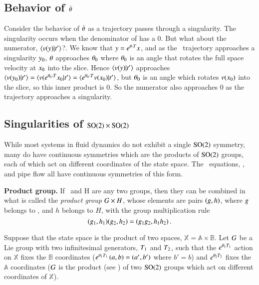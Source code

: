 \subsection{Behavior of $\dot{{\bf \theta}}$}

Consider the behavior of $\dot{{\bf \theta}}$ as a trajectory passes through a singularity. The singularity occurs when the denominator of  has a 0. But what about the numerator, $\braket{\vel(\sspRed)}{\sliceTan{}}$?. We know that $y=e^{{\bf \theta}\cdot T}x$, and as the \reducedsp\ trajectory approaches a singularity $y_0$, ${\bf \theta}$ approaches ${\bf \theta}_0$ where ${\bf \theta}_0$ is an angle that rotates the full space velocity at $x_0$ into the slice. Hence $\braket{\vel(\sspRed)}{\sliceTan{}}$ approaches $\braket{\vel(\sspRed_0)}{\sliceTan{}}
=\braket{\vel(e^{\gSpace_0\cdot\Lg}\ssp_0}{\sliceTan{}}
=\braket{e^{\gSpace_0\cdot\Lg}\vel(\ssp_0)}{\sliceTan{}}$,
but ${\bf \theta}_0$ is an angle which rotates $v(x_0)$ into the slice, so this inner product is 0. So the numerator also approaches 0 as the trajectory approaches a singularity.

\subsection{Singularities of $\textrm{SO}(2) \times \textrm{SO}(2)$}

While most systems in fluid dynamics do not exhibit a single $\textrm{SO}(2)$ symmetry, many do have continuous symmetries which are the products of $\textrm{SO}(2)$ groups, each of which act on different coordinates of the state space. The \KS\ equations, {\pCf}, and pipe flow all have continuous symmetries of this form.

\begin{definition}
\label{def:productGroup}
\textbf{Product group.}
If \Group\ and H are any two groups, then they can be combined in
what is called the {\em product group} $G \times H$, whose
elements are pairs $(g,h)$, where $g$ belongs to \Group, and
$h$ belongs to $H$, with the group multiplication rule
\[
(g_1,h_1)(g_2,h_2)=(g_1 g_2,h_1 h_2)
\,.
\]
\end{definition}

Suppose that the state space is the product of two spaces,
$\mathbb{X}=\mathbb{A} \times \mathbb{B}$. Let $G$ be a Lie group
with two infinitesimal generators, $T_1$ and $T_2$, such that the
$e^{{\bf \theta}_1 T_1}$ action on $\mathbb{X}$ fixes the $\mathbb{B}$
coordinates ($e^{{\bf \theta}_1 T_1} \, (a,b)=(a',b')$ where $b'=b$) and
$e^{{\bf \theta}_2 T_2}$ fixes the $\mathbb{A}$ coordinates ($G$ is the
product (see ) of two $\textrm{SO}(2)$ groups which act on
different coordinates of $\mathbb{X}$).

